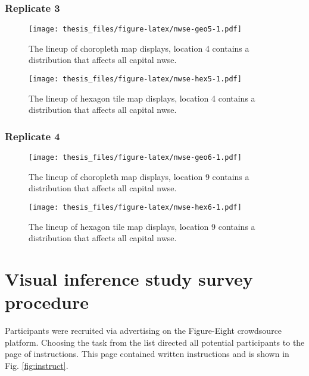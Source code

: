 \documentclass{monashthesis}
\begin{document}
\hypertarget{replicate-3-2}{%
\subsection{Replicate 3}\label{replicate-3-2}}

\begin{figure}
\centering
\texttt{[image: thesis\_files/figure-latex/nwse-geo5-1.pdf]}
\caption{\label{fig:nwse-geo5}The lineup of choropleth map displays, location 4 contains a distribution that affects all capital nwse.}
\end{figure}

\begin{figure}
\centering
\texttt{[image: thesis\_files/figure-latex/nwse-hex5-1.pdf]}
\caption{\label{fig:nwse-hex5}The lineup of hexagon tile map displays, location 4 contains a distribution that affects all capital nwse.}
\end{figure}

\hypertarget{replicate-4-2}{%
\subsection{Replicate 4}\label{replicate-4-2}}

\begin{figure}
\centering
\texttt{[image: thesis\_files/figure-latex/nwse-geo6-1.pdf]}
\caption{\label{fig:nwse-geo6}The lineup of choropleth map displays, location 9 contains a distribution that affects all capital nwse.}
\end{figure}

\begin{figure}
\centering
\texttt{[image: thesis\_files/figure-latex/nwse-hex6-1.pdf]}
\caption{\label{fig:nwse-hex6}The lineup of hexagon tile map displays, location 9 contains a distribution that affects all capital nwse.}
\end{figure}

\hypertarget{visual-inference-study-survey-procedure}{%
\chapter{Visual inference study survey procedure}\label{visual-inference-study-survey-procedure}}

Participants were recruited via advertising on the Figure-Eight crowdsource platform.
Choosing the task from the list directed all potential participants to the page of instructions.
This page contained written instructions and is shown in Fig. \ref{fig:instruct}.
\end{document}
